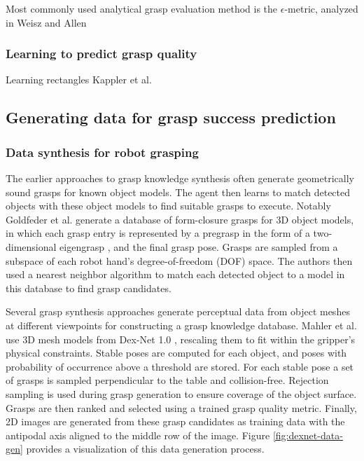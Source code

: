 Most commonly used analytical grasp evaluation method is the $\epsilon$-metric, analyzed in Weisz and Allen
\cite{WeiszAllen2012} 

\subsubsection*{Learning to predict grasp quality}
Learning rectangles \cite{mahler2017,jiang2011,lenz2015}
Kappler et al. \cite{Kappler2015}


\subsection{Generating data for grasp success prediction}

\subsubsection{Data synthesis for robot grasping}

The earlier approaches to grasp knowledge synthesis often generate geometrically sound grasps for known object models.
The agent then learns to match detected objects with these object models to find suitable grasps to execute. Notably
Goldfeder et al. \cite{Goldfeder2009CGDB} generate a database of form-closure grasps for 3D object models, in which each
grasp entry is represented by a pregrasp in the form of a two-dimensional eigengrasp \cite{Ciocarlie2009}, and the final
grasp pose. Grasps are sampled from a subspace of each robot hand's degree-of-freedom (DOF) space. The authors then used
a nearest neighbor algorithm to match each detected object to a model in this database \cite{Goldfeder2011} to find
grasp candidates.

Several grasp synthesis approaches generate perceptual data from object meshes at different viewpoints
\cite{mahler2017,Gualtieri2016,Kappler2015} for constructing a grasp knowledge database. Mahler et al. \cite{mahler2017}
use 3D mesh models from Dex-Net 1.0 \cite{mahler2016}, rescaling them to fit within the gripper's physical constraints.
Stable poses are computed for each object, and poses with probability of occurrence above a threshold are stored.
For each stable pose a set of grasps is sampled perpendicular to the table and collision-free. Rejection sampling
is used during grasp generation to ensure coverage of the object surface. Grasps are then ranked and selected using
a trained grasp quality metric. Finally, 2D images are generated from these grasp candidates as training data with the
antipodal axis aligned to the middle row of the image. Figure \ref{fig:dexnet-data-gen} provides a visualization of this
data generation process.

